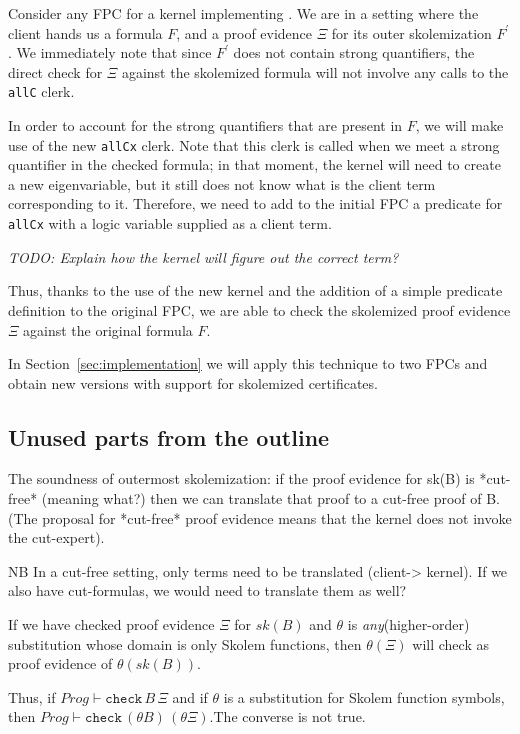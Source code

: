 Consider any FPC for a kernel implementing \LK. We are in a setting
where the client hands us a formula $F$, and a proof evidence $\Xi$
for its outer skolemization $F^\prime$. We immediately note that since
$F^\prime$ does not contain strong quantifiers, the direct check for
$\Xi$ against the skolemized formula will not involve any calls to the
\texttt{allC} clerk.

In order to account for the strong quantifiers that are present in
$F$, we will make use of the new \texttt{allCx} clerk. Note that this
clerk is called when we meet a strong quantifier in the checked
formula; in that moment, the kernel will need to create a new
eigenvariable, but it still does not know what is the client term
corresponding to it.
%
Therefore, we need to add to the initial FPC a predicate for
\texttt{allCx} with a logic variable supplied as a client term.

\emph{TODO: Explain how the kernel will figure out the correct term?}

Thus, thanks to the use of the new kernel and the addition of a simple
predicate definition to the original FPC, we are able to check the
skolemized proof evidence $\Xi$ against the original formula $F$.

In Section~\ref{sec:implementation} we will apply this technique to
two FPCs and obtain new versions with support for skolemized
certificates.







\subsection{Unused parts from the outline}
The soundness of outermost skolemization: if the proof evidence for
sk(B) is *cut-free* (meaning what?) then we can translate that proof
to a cut-free proof of B.  (The proposal for *cut-free* proof evidence
means that the kernel does not invoke the cut-expert).

NB In a cut-free setting, only terms need to be translated (client->
kernel).  If we also have cut-formulas, we would need to translate
them as well?

If we have checked proof evidence $\Xi$ for $sk(B)$ and $\theta$ is
\emph{any}(higher-order) substitution whose domain is only Skolem
functions, then $\theta(\Xi)$ will check as proof evidence of $\theta
(sk(B))$.

Thus, if $Prog \vdash \mathtt{check} \, B \, \Xi$ and if $\theta$ is a
substitution for Skolem function symbols, then $Prog \vdash
\mathtt{check}\, (\theta B) \, (\theta \Xi)$.The converse is not true.

